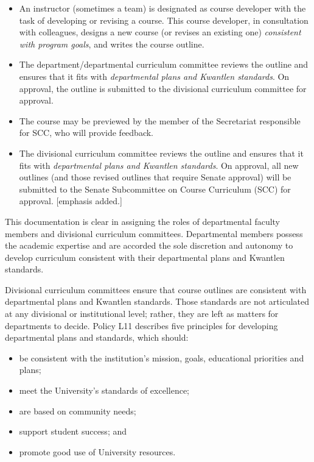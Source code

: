 \documentclass[letterpaper,10pt,headsepline]{scrreprt}
\begin{document}
\begin{itemize}
\item An instructor (sometimes a team) is designated as course developer with the task of developing or revising a course. This course developer, in consultation with colleagues, designs a new course (or revises an existing one) \textit{consistent with program goals}, and writes the course outline.

\item The department/departmental curriculum committee reviews the outline and ensures that it fits with \textit{departmental plans and Kwantlen standards}. On approval, the outline is submitted to the divisional curriculum committee for approval.

\item The course may be previewed by the member of the Secretariat responsible for SCC, who will provide feedback.

\item The divisional curriculum committee reviews the outline and ensures that it fits with \textit{departmental plans and Kwantlen standards}. On approval, all new outlines (and those revised outlines that require Senate approval) will be submitted to the Senate Subcommittee on Course Curriculum (SCC) for approval. [emphasis added.]
\end{itemize}

This documentation is clear in assigning the roles of departmental faculty members and divisional curriculum committees. Departmental members possess the academic expertise and are accorded the sole discretion and autonomy to develop curriculum consistent with their departmental plans and Kwantlen standards.

Divisional curriculum committees ensure that course outlines are consistent with departmental plans and Kwantlen standards. Those standards are not articulated at any divisional or institutional level; rather, they are left as matters for departments to decide. Policy L11 describes five principles for developing departmental plans and standards, which should:

\begin{itemize}
\item be consistent with the institution's mission, goals, educational priorities and plans;
\item meet the University's standards of excellence; 
\item are based on community needs;
\item support student success; and
\item promote good use of University resources.
\end{itemize}
\end{document}
